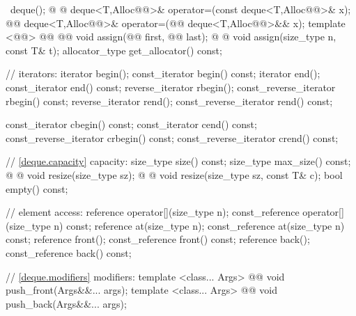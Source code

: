 \documentclass[american,twoside]{book}
\begin{document}
\begin{codeblock}
{{   ~deque();
    @ @
      deque<T,Alloc@@>& operator=(const deque<T,Alloc@@>& x);
    @@
      deque<T,Alloc@@>& operator=(@@ deque<T,Alloc@@>&& x);
    template <@@>
      @@
          @@
      void assign(@@ first, @@ last);
    @ @ 
      void assign(size_type n, const T& t);
    allocator_type get_allocator() const;

    // iterators:
    iterator               begin();
    const_iterator         begin() const;
    iterator               end();
    const_iterator         end() const;
    reverse_iterator       rbegin();
    const_reverse_iterator rbegin() const;
    reverse_iterator       rend();
    const_reverse_iterator rend() const;

    const_iterator         cbegin() const;
    const_iterator         cend() const;
    const_reverse_iterator crbegin() const;
    const_reverse_iterator crend() const;

    // \ref{deque.capacity} capacity:
    size_type size() const;
    size_type max_size() const;
    @  @ 
      void resize(size_type sz);
    @ @
      void resize(size_type sz, const T& c);
    bool empty() const;

    // element access:
    reference       operator[](size_type n);
    const_reference operator[](size_type n) const;
    reference       at(size_type n);
    const_reference at(size_type n) const;
    reference       front();
    const_reference front() const;
    reference       back();
    const_reference back() const;

    // \ref{deque.modifiers} modifiers:
    template <class... Args> 
      @@ 
      void push_front(Args&&... args);
    template <class... Args> 
      @@ 
      void push_back(Args&&... args);

}}
\end{codeblock}
\end{document}
